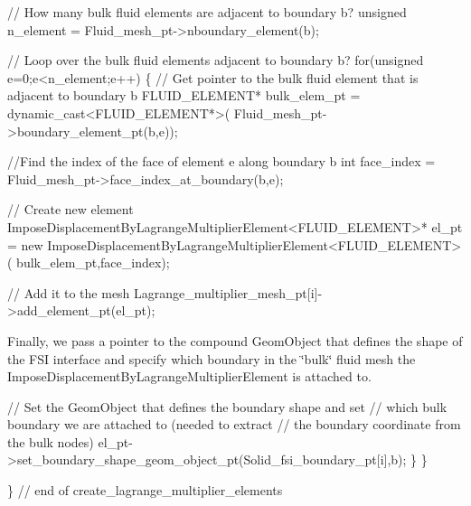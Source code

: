 \begin{DoxyCodeInclude}
   
   \textcolor{comment}{// How many bulk fluid elements are adjacent to boundary b?}
   \textcolor{keywordtype}{unsigned} n\_element = Fluid\_mesh\_pt->nboundary\_element(b);
   
   \textcolor{comment}{// Loop over the bulk fluid elements adjacent to boundary b?}
   \textcolor{keywordflow}{for}(\textcolor{keywordtype}{unsigned} e=0;e<n\_element;e++)
    \{
     \textcolor{comment}{// Get pointer to the bulk fluid element that is adjacent to boundary b}
     FLUID\_ELEMENT* bulk\_elem\_pt = \textcolor{keyword}{dynamic\_cast<}FLUID\_ELEMENT*\textcolor{keyword}{>}(
      Fluid\_mesh\_pt->boundary\_element\_pt(b,e));
     
     \textcolor{comment}{//Find the index of the face of element e along boundary b}
     \textcolor{keywordtype}{int} face\_index = Fluid\_mesh\_pt->face\_index\_at\_boundary(b,e);
     
     \textcolor{comment}{// Create new element}
     ImposeDisplacementByLagrangeMultiplierElement<FLUID\_ELEMENT>* el\_pt =
      \textcolor{keyword}{new} ImposeDisplacementByLagrangeMultiplierElement<FLUID\_ELEMENT>(
       bulk\_elem\_pt,face\_index);   
     
     \textcolor{comment}{// Add it to the mesh}
     Lagrange\_multiplier\_mesh\_pt[i]->add\_element\_pt(el\_pt);

\end{DoxyCodeInclude}


Finally, we pass a pointer to the compound {\ttfamily Geom\+Object} that defines the shape of the F\+SI interface and specify which boundary in the \char`\"{}bulk\char`\"{} fluid mesh the {\ttfamily Impose\+Displacement\+By\+Lagrange\+Multiplier\+Element} is attached to.


\begin{DoxyCodeInclude}
     
     \textcolor{comment}{// Set the GeomObject that defines the boundary shape and set}
     \textcolor{comment}{// which bulk boundary we are attached to (needed to extract}
     \textcolor{comment}{// the boundary coordinate from the bulk nodes)}
     el\_pt->set\_boundary\_shape\_geom\_object\_pt(Solid\_fsi\_boundary\_pt[i],b);
    \}
  \}

\} \textcolor{comment}{// end of create\_lagrange\_multiplier\_elements}

\end{DoxyCodeInclude}




